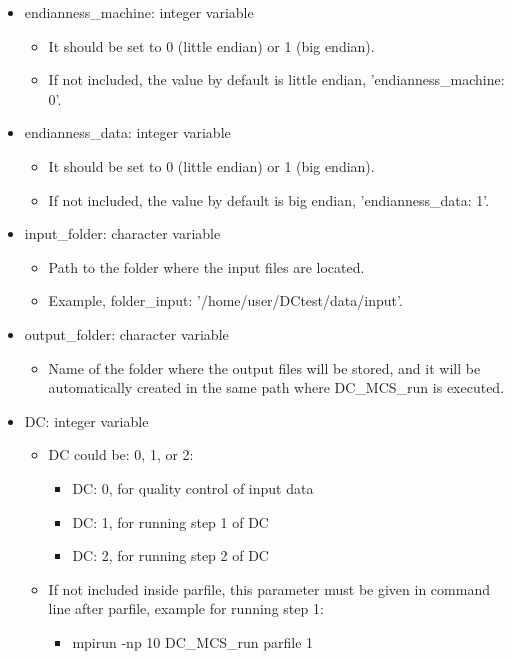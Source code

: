 \documentclass[11pt, oneside]{article}   	%
\begin{document}
\begin{itemize}

 \item endianness\_machine: integer variable
	\begin{itemize}
	\item It should be set to 0 (little endian) or 1 (big endian).
	\item If not included, the value by default is little endian, 'endianness\_machine: 0'.
	\end{itemize}

 \item endianness\_data: integer variable 
	\begin{itemize}
	\item It should be set to 0 (little endian) or 1 (big endian).
	\item If not included, the value by default is big endian, 'endianness\_data: 1'.
	\end{itemize}

\item input\_folder: character variable
	\begin{itemize}
	\item Path to the folder where the input files are located.
	\item Example, folder\_input:  '/home/user/DCtest/data/input'.
	\end{itemize}

\item output\_folder: character variable
	\begin{itemize}
	\item Name of the folder where the output files will be stored, and it will be automatically created in the same path where DC\_MCS\_run is executed.
	\end{itemize}
	
\item DC: integer variable 
	\begin{itemize}
	\item DC could be: 0, 1, or 2:
		\begin{itemize}
		\item DC: 0, for quality control of input data 
		\item DC: 1, for running step 1 of DC 
		\item DC: 2, for running step 2 of DC
		\end{itemize}
	\item If not included inside parfile, this parameter must be given in command line after parfile, example for running step 1: 
		\begin{itemize}
		\item mpirun -np 10 DC\_MCS\_run parfile 1
		\end{itemize}
	\end{itemize}
	

\end{itemize}
\end{document}

